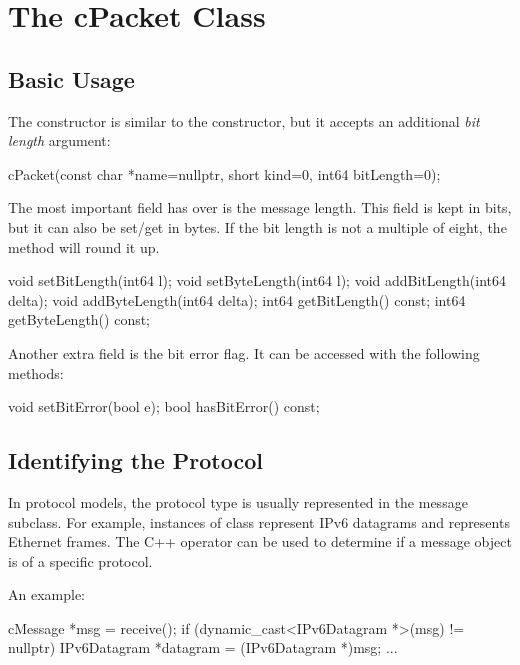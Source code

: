 \section{The cPacket Class}
\label{sec:ch-msgs:cpacket}

\subsection{Basic Usage}

The  constructor is similar to the 
constructor, but it accepts an additional \textit{bit length} argument:

\begin{cpp}
cPacket(const char *name=nullptr, short kind=0, int64 bitLength=0);
\end{cpp}

The most important field  has over  is
the message length. This field is kept in bits, but it can also be
set/get in bytes. If the bit length is not a multiple of eight, the
 method will round it up.

\begin{cpp}
void setBitLength(int64 l);
void setByteLength(int64 l);
void addBitLength(int64 delta);
void addByteLength(int64 delta);
int64 getBitLength() const;
int64 getByteLength() const;
\end{cpp}

Another extra field is the bit error flag. It can be accessed with the
following methods:

\begin{cpp}
void setBitError(bool e);
bool hasBitError() const;
\end{cpp}


\subsection{Identifying the Protocol}

In {\opp} protocol models, the protocol type is usually represented in the
message subclass. For example, instances of class 
represent IPv6 datagrams and  represents Ethernet
frames. The C++  operator can be used to determine if a
message object is of a specific protocol.

An example:

\begin{cpp}
cMessage *msg = receive();
if (dynamic_cast<IPv6Datagram *>(msg) != nullptr)
{
    IPv6Datagram *datagram = (IPv6Datagram *)msg;
    ...
}
\end{cpp}


